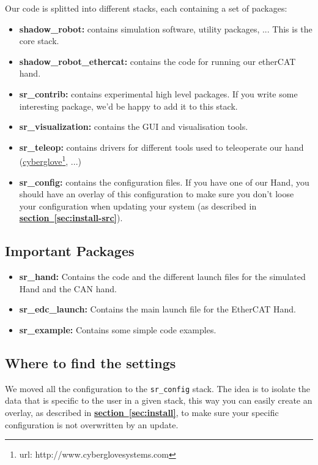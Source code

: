\documentclass[12pt]{article}
\newcommand{\link}[1]{\hyperref[sec:#1]{\textbf{section~\ref*{sec:#1}}}}
\newcommand{\betterhref}[2]{\href{#1}{#2}\footnote{url: #1}}
\begin{document}
\par Our code is splitted into different stacks, each containing a set of packages:
\begin{itemize}
\item \textbf{shadow\_robot:} contains simulation software, utility packages, ... This is the core stack.
\item \textbf{shadow\_robot\_ethercat:} contains the code for running our etherCAT hand.
\item \textbf{sr\_contrib:} contains experimental high level packages. If you write some interesting package, we'd be happy to add it to this stack.
\item \textbf{sr\_visualization:} contains the GUI and visualisation tools.
\item \textbf{sr\_teleop:} contains drivers for different tools used to teleoperate our hand (\betterhref{http://www.cyberglovesystems.com}{cyberglove}, ...)
\item \textbf{sr\_config:} contains the configuration files. If you have one of our Hand, you should have an overlay of this configuration to make sure you don't loose your configuration when updating your system (as described in \link{install-src}).
\end{itemize}

\subsection{Important Packages}
\label{sec:important-packages}
\begin{itemize}
\item \textbf{sr\_hand:} Contains the code and the different launch files for the simulated Hand and the CAN hand.
\item \textbf{sr\_edc\_launch:} Contains the main launch file for the EtherCAT Hand.
\item \textbf{sr\_example:} Contains some simple code examples.
\end{itemize}


\subsection{Where to find the settings}
\label{sec:where-find-settings}
\par We moved all the configuration to the \texttt{sr\_config} stack. The idea is to isolate the data that is specific to the user in a given stack, this way you can easily create an overlay, as described in \link{install}, to make sure your specific configuration is not overwritten by an update.
\end{document}
